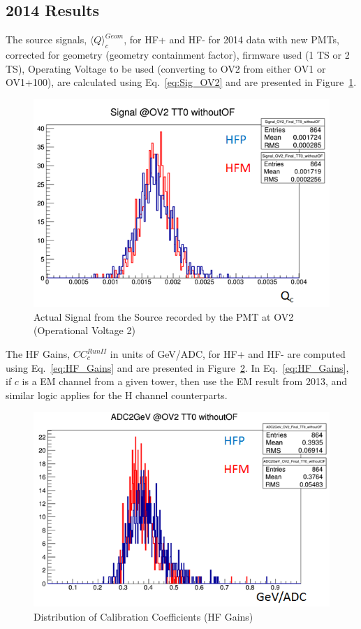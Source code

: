 \subsection{2014 Results}
The source signals, ${\langle{Q}\rangle}^{Geom}_{c}$, for HF+ and HF- for 2014 data with new PMTs, corrected for geometry (geometry containment factor), firmware used (1 TS or 2 TS), Operating Voltage to be used (converting to OV2 from either OV1 or OV1+100), are calculated using Eq.~\ref{eq:Sig_OV2} and are presented in Figure~\ref{fig:Signal_@OV2_TT0_withoutOF_FORDN}.
\begin{figure}[htb]
	\begin{center}
		\includegraphics[width=.6\textwidth]{figures/ch_hfcalibration/Signal_@OV2_TT0_withoutOF_FORDN.png}
		\caption{Actual Signal from the Source recorded by the PMT at OV2 (Operational Voltage 2)}
		\label{fig:Signal_@OV2_TT0_withoutOF_FORDN}
	\end{center}
\end{figure}

The HF Gains, ${CC}^{Run II}_{c}$ in units of GeV/ADC, for HF+ and HF- are
computed using Eq.~\ref{eq:HF_Gains} and are presented in Figure~\ref{fig:ADC2GeV_OV2_TT0_withoutOF_FORDN}. In Eq.~\ref{eq:HF_Gains}, if $c$ is a EM channel from a given tower, then use the EM result from 2013, and similar logic applies for the H channel counterparts.
\begin{figure}[!h]
	\begin{center}
		\includegraphics[width=.6\textwidth]{figures/ch_hfcalibration/ADC2GeV_OV2_TT0_withoutOF_FORDN.png}
		\caption{Distribution of Calibration Coefficients (HF Gains)}
		\label{fig:ADC2GeV_OV2_TT0_withoutOF_FORDN}
	\end{center}
\end{figure}

